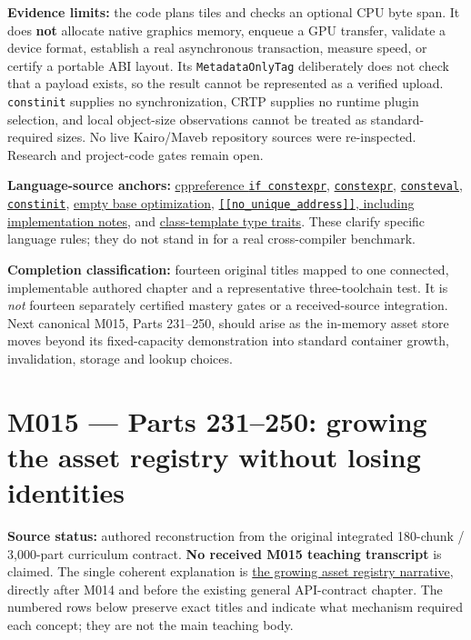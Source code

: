 \textbf{Evidence limits:} the code plans tiles and checks an optional CPU byte span. It does \textbf{not} allocate native graphics memory, enqueue a GPU transfer, validate a device format, establish a real asynchronous transaction, measure speed, or certify a portable ABI layout. Its \texttt{MetadataOnlyTag} deliberately does not check that a payload exists, so the result cannot be represented as a verified upload. \texttt{constinit} supplies no synchronization, CRTP supplies no runtime plugin selection, and local object-size observations cannot be treated as standard-required sizes. No live Kairo/Maveb repository sources were re-inspected. Research and project-code gates remain open.

\textbf{Language-source anchors:} \href{https://en.cppreference.com/w/cpp/language/if}{cppreference \texttt{if\ constexpr}}, \href{https://en.cppreference.com/w/cpp/language/constexpr}{\texttt{constexpr}}, \href{https://en.cppreference.com/w/cpp/language/consteval}{\texttt{consteval}}, \href{https://en.cppreference.com/w/cpp/language/constinit}{\texttt{constinit}}, \href{https://en.cppreference.com/w/cpp/language/ebo}{empty base optimization}, \href{https://en.cppreference.com/w/cpp/language/attributes/no_unique_address}{\texttt{{[}{[}no\_unique\_address{]}{]}}, including implementation notes}, and \href{https://en.cppreference.com/w/cpp/types}{class-template type traits}. These clarify specific language rules; they do not stand in for a real cross-compiler benchmark.

\textbf{Completion classification:} fourteen original titles mapped to one connected, implementable authored chapter and a representative three-toolchain test. It is \emph{not} fourteen separately certified mastery gates or a received-source integration. Next canonical M015, Parts 231--250, should arise as the in-memory asset store moves beyond its fixed-capacity demonstration into standard container growth, invalidation, storage and lookup choices.

\section{M015 --- Parts 231--250: growing the asset registry without losing identities}\label{appendix-fd090d982a15-m015-parts-231250-growing-the-asset-registry-without-losing-identities}

\textbf{Source status:} authored reconstruction from the original integrated 180-chunk / 3,000-part curriculum contract. \textbf{No received M015 teaching transcript} is claimed. The single coherent explanation is \href{Continuous\%20Notes/Computing\%20Foundations\%20-\%20From\%20Bits\%20to\%20C++\%20and\%20Systems\%20APIs\#An\%20asset\%20registry\%20grows\%20while\%20its\%20handles\%20must\%20not\%20change}{the growing asset registry narrative}, directly after M014 and before the existing general API-contract chapter. The numbered rows below preserve exact titles and indicate what mechanism required each concept; they are not the main teaching body.

